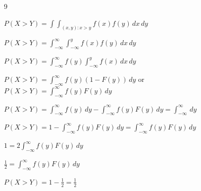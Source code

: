 \documentclass[12 pt]{article}
\begin{document}
    \begin{exercise}{9}
    \hfill

    $P(X>Y) = \int \int_{(x,y):x>y} f(x) f(y) \, dx \, dy$

    $P(X>Y) = \int_{-\infty}^{\infty} \int_{-\infty}^{y} f(x) f(y) \, dx \, dy$

    $P(X>Y) = \int_{-\infty}^{\infty} f(y) \int_{-\infty}^{y} f(x) \, dx \, dy$

    $P(X>Y) = \int_{-\infty}^{\infty} f(y)(1-F(y)) \, dy$ or $P(X>Y) = \int_{-\infty}^{\infty} f(y) F(y) \,dy$

    $P(X>Y) = \int_{-\infty}^{\infty} f(y) \, dy - \int_{-\infty}^{\infty} f(y) F(y) \, dy = \int_{-\infty}^{\infty} \, dy$

    $P(X>Y) = 1 - \int_{-\infty}^{\infty} f(y) F(y) \, dy = \int_{-\infty}^{\infty} f(y) F(y) \, dy$

    $1 = 2 \int_{-\infty}^{\infty} f(y) F(y) \, dy$

    $\frac{1}{2} = \int_{-\infty}^{\infty} f(y) F(y) \, dy$

    $P(X>Y) = 1 - \frac{1}{2} = \frac{1}{2}$

    \hfill
    \end{exercise}
\end{document}
